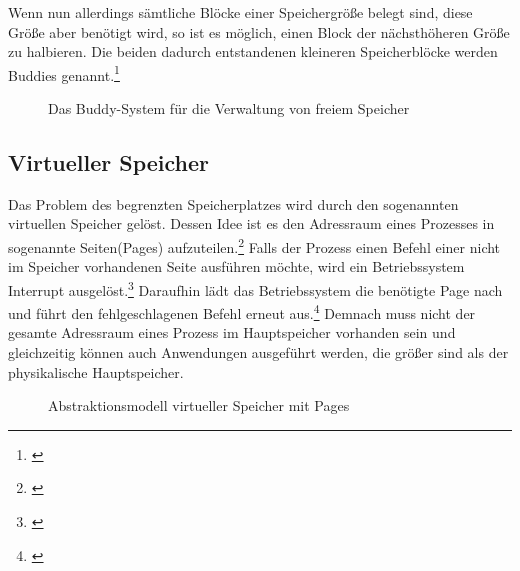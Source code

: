 Wenn nun allerdings sämtliche Blöcke einer Speichergröße belegt sind, diese Größe aber benötigt wird, so ist es möglich, einen Block der nächsthöheren Größe zu halbieren. Die beiden dadurch entstandenen kleineren Speicherblöcke werden Buddies genannt.\footnote{\cite[S.~126]{Brause.2017}}

\begin{figure}[htb]
	\centering
	\caption{Das Buddy-System für die Verwaltung von freiem Speicher}
\end{figure}

\subsection{Virtueller Speicher}
\label{subsec:VirtuelleAdressraeume}
Das Problem des begrenzten Speicherplatzes wird durch den sogenannten virtuellen Speicher gelöst. Dessen Idee ist es den Adressraum eines Prozesses in sogenannte Seiten(Pages) aufzuteilen.\footnote{\cite[S.~252]{Tanenbaum.2016}} Falls der Prozess einen Befehl einer nicht im Speicher vorhandenen Seite ausführen möchte, wird ein Betriebssystem Interrupt ausgelöst.\footnote{\cite[S.~252]{Tanenbaum.2016}} Daraufhin lädt das Betriebssystem die benötigte Page nach und führt den fehlgeschlagenen Befehl erneut aus.\footnote{\cite[S.~252]{Tanenbaum.2016}} Demnach muss nicht der gesamte Adressraum eines Prozess im Hauptspeicher vorhanden sein und gleichzeitig können auch Anwendungen ausgeführt werden, die größer sind als der physikalische Hauptspeicher.

\begin{figure}[htb]
	\centering
	\caption{Abstraktionsmodell virtueller Speicher mit Pages}
\end{figure}


